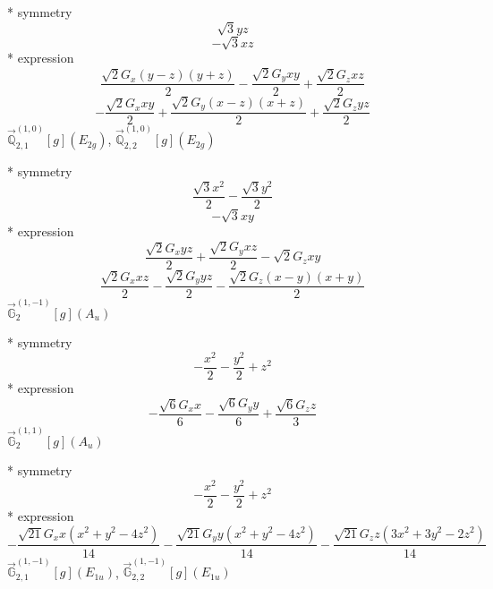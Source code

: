 \documentclass[fleqn,8pt]{jsarticle}
\begin{document}
\noindent\quad ** symmetry
\begin{dmath*}
\sqrt{3} y z
\end{dmath*}
\begin{dmath*}
- \sqrt{3} x z
\end{dmath*}
\noindent\quad ** expression
\begin{dmath*}
\frac{\sqrt{2} G_{x} \left(y - z\right) \left(y + z\right)}{2} - \frac{\sqrt{2} G_{y} x y}{2} + \frac{\sqrt{2} G_{z} x z}{2}
\end{dmath*}
\begin{dmath*}
- \frac{\sqrt{2} G_{x} x y}{2} + \frac{\sqrt{2} G_{y} \left(x - z\right) \left(x + z\right)}{2} + \frac{\sqrt{2} G_{z} y z}{2}
\end{dmath*}
\noindent\quad $\vec{\mathbb{Q}}_{2,1}^{(1,0)}[g](E_{2g})$, $\vec{\mathbb{Q}}_{2,2}^{(1,0)}[g](E_{2g})$

\noindent\quad ** symmetry
\begin{dmath*}
\frac{\sqrt{3} x^{2}}{2} - \frac{\sqrt{3} y^{2}}{2}
\end{dmath*}
\begin{dmath*}
- \sqrt{3} x y
\end{dmath*}
\noindent\quad ** expression
\begin{dmath*}
\frac{\sqrt{2} G_{x} y z}{2} + \frac{\sqrt{2} G_{y} x z}{2} - \sqrt{2} G_{z} x y
\end{dmath*}
\begin{dmath*}
\frac{\sqrt{2} G_{x} x z}{2} - \frac{\sqrt{2} G_{y} y z}{2} - \frac{\sqrt{2} G_{z} \left(x - y\right) \left(x + y\right)}{2}
\end{dmath*}
\noindent\quad $\vec{\mathbb{G}}_{2}^{(1,-1)}[g](A_{u})$

\noindent\quad ** symmetry
\begin{dmath*}
- \frac{x^{2}}{2} - \frac{y^{2}}{2} + z^{2}
\end{dmath*}
\noindent\quad ** expression
\begin{dmath*}
- \frac{\sqrt{6} G_{x} x}{6} - \frac{\sqrt{6} G_{y} y}{6} + \frac{\sqrt{6} G_{z} z}{3}
\end{dmath*}
\noindent\quad $\vec{\mathbb{G}}_{2}^{(1,1)}[g](A_{u})$

\noindent\quad ** symmetry
\begin{dmath*}
- \frac{x^{2}}{2} - \frac{y^{2}}{2} + z^{2}
\end{dmath*}
\noindent\quad ** expression
\begin{dmath*}
- \frac{\sqrt{21} G_{x} x \left(x^{2} + y^{2} - 4 z^{2}\right)}{14} - \frac{\sqrt{21} G_{y} y \left(x^{2} + y^{2} - 4 z^{2}\right)}{14} - \frac{\sqrt{21} G_{z} z \left(3 x^{2} + 3 y^{2} - 2 z^{2}\right)}{14}
\end{dmath*}
\noindent\quad $\vec{\mathbb{G}}_{2,1}^{(1,-1)}[g](E_{1u})$, $\vec{\mathbb{G}}_{2,2}^{(1,-1)}[g](E_{1u})$
\end{document}
